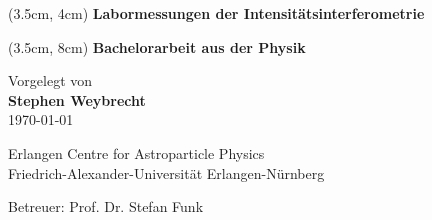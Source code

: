
\begin{center}

    \vspace*{3cm}
 
    \begin{textblock*}{15 cm}(3.5cm, 4cm)
        \Large \bf{Labormessungen der Intensitätsinterferometrie}
    \end{textblock*}

    \begin{textblock*}{15 cm}(3.5cm, 8cm)
        \bf{Bachelorarbeit aus der Physik}
    \end{textblock*}

    \vspace{4cm}
    
    \vspace{1.2cm}
            Vorgelegt von\\
            {\bf Stephen Weybrecht} \\
            \today

    \vspace*{2.5 cm}
    Erlangen Centre for Astroparticle Physics\\
    Friedrich-Alexander-Universität Erlangen-Nürnberg
    \vspace*{1 cm}

    \vspace*{6 cm}
    Betreuer: Prof. Dr. Stefan Funk
    \vspace*{1 cm}

\end{center}

